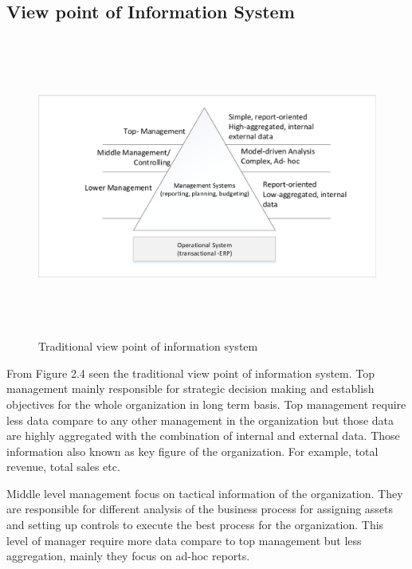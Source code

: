 \subsection{View point of Information System}
\begin{figure}[!ht]
	\centering
		\includegraphics[width=530pt, height=280pt, width=1.0\textwidth]{images/info1.pdf}
	\caption[Traditional view point of information system]{Traditional view point of information system\footnotemark} 
	\label{fig:Inmon}

\end{figure}

From Figure 2.4 seen the traditional view point of information system. Top management mainly responsible for strategic decision making and establish objectives for the whole organization in long term basis. Top management require less data compare to any other management in the organization but those data are highly aggregated with the combination of internal and external data. Those information also known as key figure of the organization. For example, total revenue, total sales etc.\newline

Middle level management focus on tactical information of the organization. They are responsible for different analysis of the business process for assigning assets and setting up controls to execute the best process for the organization. This level of manager require more data compare to top management but less aggregation, mainly they focus on ad-hoc reports.\newline

